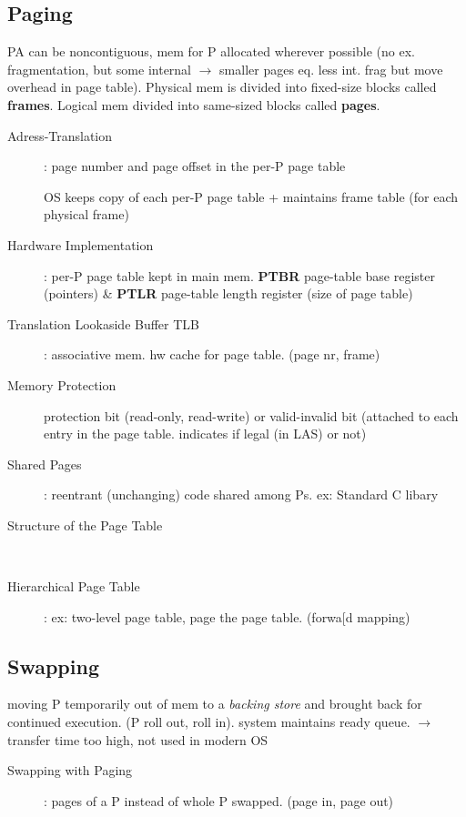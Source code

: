 \subsection*{Paging}
PA can be noncontiguous, mem for P allocated wherever possible (no ex. fragmentation, but some internal $\rightarrow$ smaller pages eq. less int. frag but move overhead in page table). Physical mem is divided into fixed-size blocks called \textbf{frames}. Logical mem divided into same-sized blocks called \textbf{pages}.\\
\begin{description}
    \item[Adress-Translation]: page number and page offset in the per-P page table
    \item[] OS keeps copy of each per-P page table + maintains frame table (for each physical frame)
    \item[Hardware Implementation]: per-P page table kept in main mem. \textbf{PTBR} page-table base register (pointers) \& \textbf{PTLR} page-table length register (size of page table)
    \item[Translation Lookaside Buffer TLB]: associative mem. hw cache for page table. (page nr, frame)
    \item[Memory Protection] protection bit (read-only, read-write) or valid-invalid bit (attached to each entry in the page table. indicates if legal (in LAS) or not)
    \item[Shared Pages]: reentrant (unchanging) code shared among Ps. ex: Standard C libary
    \item[Structure of the Page Table] \\
    \item[Hierarchical Page Table]: ex: two-level page table, page the page table. (forwa[d mapping) \\
\end{description}

\subsection*{Swapping}
moving P temporarily out of mem to a \textit{backing store} and brought back for continued execution. (P roll out, roll in). system maintains ready queue. $\rightarrow$ transfer time too high, not used in modern OS
\begin{description}
    \item[Swapping with Paging]: pages of a P instead of whole P swapped. (page in, page out)
\end{description}
